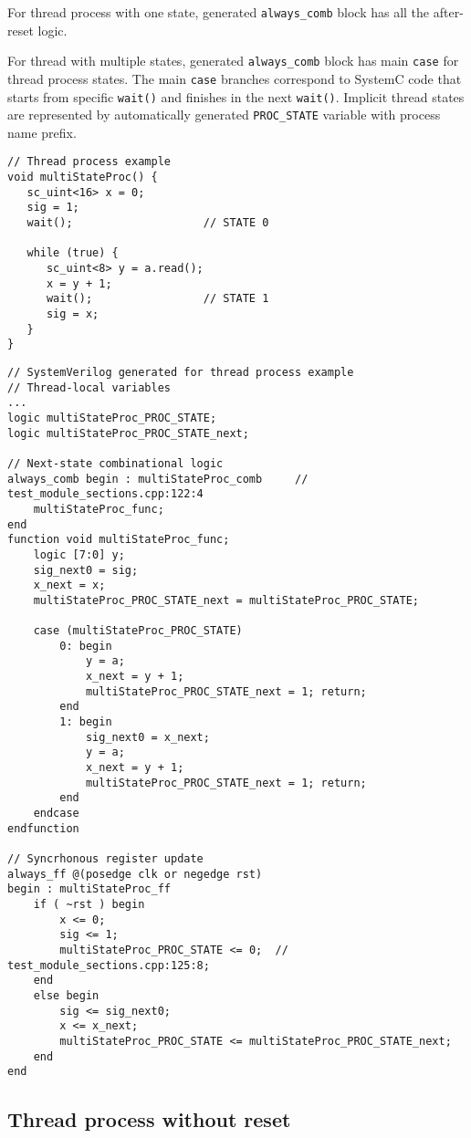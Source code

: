 For thread process with one state, generated {\tt always\_comb} block has all the after-reset logic.

For thread with multiple states, generated {\tt always\_comb} block has main {\tt case} for thread process states. The main {\tt case} branches correspond to SystemC code that starts from specific {\tt wait()} and finishes in the next {\tt wait()}. Implicit thread states are represented by automatically generated {\tt PROC\_STATE} variable with process name prefix. 

\begin{lstlisting}[style=mycpp]
// Thread process example
void multiStateProc() {
   sc_uint<16> x = 0;
   sig = 1;              
   wait();                    // STATE 0

   while (true) {
      sc_uint<8> y = a.read(); 
      x = y + 1;
      wait();                 // STATE 1
      sig = x;           
   }
}
\end{lstlisting}

\begin{lstlisting}[style=myverilog]
// SystemVerilog generated for thread process example
// Thread-local variables
...
logic multiStateProc_PROC_STATE;
logic multiStateProc_PROC_STATE_next;

// Next-state combinational logic
always_comb begin : multiStateProc_comb     // test_module_sections.cpp:122:4
    multiStateProc_func;
end
function void multiStateProc_func;
    logic [7:0] y;
    sig_next0 = sig;
    x_next = x;
    multiStateProc_PROC_STATE_next = multiStateProc_PROC_STATE;
    
    case (multiStateProc_PROC_STATE)
        0: begin
            y = a;
            x_next = y + 1;
            multiStateProc_PROC_STATE_next = 1; return;  
        end
        1: begin
            sig_next0 = x_next;
            y = a;
            x_next = y + 1;
            multiStateProc_PROC_STATE_next = 1; return; 
        end
    endcase
endfunction

// Syncrhonous register update
always_ff @(posedge clk or negedge rst) 
begin : multiStateProc_ff
    if ( ~rst ) begin
        x <= 0;
        sig <= 1;
        multiStateProc_PROC_STATE <= 0;  // test_module_sections.cpp:125:8;
    end
    else begin
        sig <= sig_next0;
        x <= x_next;
        multiStateProc_PROC_STATE <= multiStateProc_PROC_STATE_next;
    end
end
\end{lstlisting}

\subsection{Thread process without reset}\label{section:noreset}


